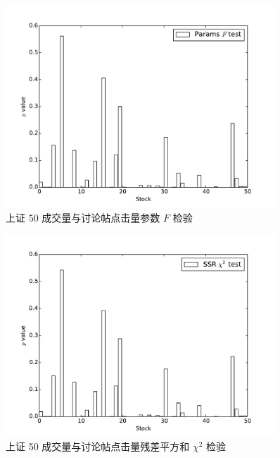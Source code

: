 \begin{figure}
  \centering
  \includegraphics[width=0.9\textwidth]{plots/click_count_volume_granger_causality_test_on_sse_50_params_ftest.pdf}
  \caption{上证 50 成交量与讨论帖点击量参数 $F$ 检验}
  \label{f_test:13}
\end{figure}

\begin{figure}
  \centering
  \includegraphics[width=0.9\textwidth]{plots/click_count_volume_granger_causality_test_on_sse_50_ssr_chi2test.pdf}
  \caption{上证 50 成交量与讨论帖点击量残差平方和 $\chi^{2}$ 检验}
  \label{f_test:14}
\end{figure}

